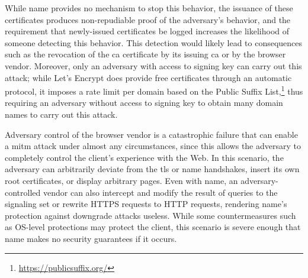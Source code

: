 While \ac{name} provides no mechanism to stop this behavior, the issuance of
these certificates produces non-repudiable proof of the adversary's behavior,
and the requirement that newly-issued certificates be logged increases the
likelihood of someone detecting this behavior. This detection would likely lead
to consequences such as the revocation of the \ac{ca} certificate by its issuing
\ac{ca} or by the browser vendor. Moreover, only an adversary with access to
 signing key can carry out this attack; while Let's Encrypt does provide
free certificates through an automatic protocol, it imposes a rate limit per
domain based on the Public Suffix
List,\footnote{\url{https://publicsuffix.org/}} thus requiring an adversary
without access to  signing key to obtain many domain names to carry out
this attack.

Adversary control of the browser vendor is a catastrophic failure that can
enable a \ac{mitm} attack under almost any circumstances, since this allows the
adversary to completely control the client's experience with the Web. In this
scenario, the adversary can arbitrarily deviate from the \ac{tls} or \ac{name}
handshakes, insert its own root certificates, or display arbitrary pages. Even
with \ac{name}, an adversary-controlled vendor can also intercept and modify the
result of queries to the signaling set or rewrite HTTPS requests to HTTP
requests, rendering \ac{name}'s protection against downgrade attacks useless.
While some countermeasures such as OS-level protections may protect the client,
this scenario is severe enough that \ac{name} makes no security guarantees if it
occurs.

